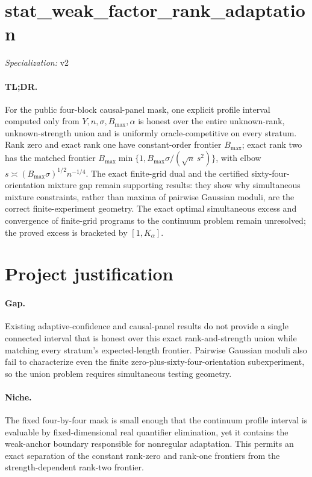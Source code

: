 \documentclass{article}
\begin{document}
\sloppy

\section*{stat\_\allowbreak{}weak\_\allowbreak{}factor\_\allowbreak{}rank\_\allowbreak{}adaptation}

\noindent\textit{Specialization:} v2\par

\paragraph{TL;DR.} For the public four-block causal-panel mask, one explicit profile interval computed only from \(Y,n,\sigma,B_{\max},\alpha\) is honest over the entire unknown-rank, unknown-strength union and is uniformly oracle-competitive on every stratum. Rank zero and exact rank one have constant-order frontier \(B_{\max}\); exact rank two has the matched frontier \(B_{\max}\min\{1,B_{\max}\sigma/(\sqrt n\,s^2)\}\), with elbow \(s\asymp(B_{\max}\sigma)^{1/2}n^{-1/4}\). The exact finite-grid dual and the certified sixty-four-orientation mixture gap remain supporting results: they show why simultaneous mixture constraints, rather than maxima of pairwise Gaussian moduli, are the correct finite-experiment geometry. The exact optimal simultaneous excess and convergence of finite-grid programs to the continuum problem remain unresolved; the proved excess is bracketed by \([1,K_\alpha]\).

\section{Project justification}

\paragraph{Gap.} Existing adaptive-confidence and causal-panel results do not provide a single connected interval that is honest over this exact rank-and-strength union while matching every stratum's expected-length frontier. Pairwise Gaussian moduli also fail to characterize even the finite zero-plus-sixty-four-orientation subexperiment, so the union problem requires simultaneous testing geometry.

\paragraph{Niche.} The fixed four-by-four mask is small enough that the continuum profile interval is evaluable by fixed-dimensional real quantifier elimination, yet it contains the weak-anchor boundary responsible for nonregular adaptation. This permits an exact separation of the constant rank-zero and rank-one frontiers from the strength-dependent rank-two frontier.
\end{document}

